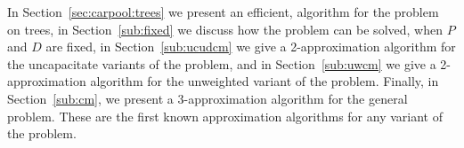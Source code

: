 In Section~\ref{sec:carpool:trees} we present an efficient,
algorithm for the problem on trees, 
in Section~\ref{sub:fixed} we discuss how the problem can be solved,
when $P$ and $D$ are fixed,
in Section~\ref{sub:ucudcm} we give a 2-approximation algorithm
for the uncapacitate variants of the problem, 
and in Section~\ref{sub:uwcm} we give a 2-approximation algorithm for the
unweighted variant of the problem.
Finally, in Section~\ref{sub:cm}, we present a 3-approximation
algorithm for the general problem. 
These are the first known approximation algorithms for any variant of the problem.
